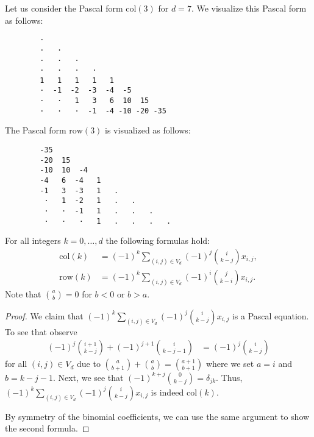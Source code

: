 \begin{example}
    Let us consider the Pascal form \( \mathrm{col}(3) \) for \( d = 7 \). We visualize this Pascal form as follows: 
    \begin{verbatim}
        · 
        ·   · 
        ·   ·   · 
        ·   ·   ·   · 
        1   1   1   1   1 
        ·  -1  -2  -3  -4  -5 
        ·   ·   1   3   6  10  15 
        ·   ·   ·  -1  -4 -10 -20 -35
    \end{verbatim}

    The Pascal form \( \mathrm{row}(3) \) is visualized as follows:
    \begin{verbatim}
        -35 
        -20  15 
        -10  10  -4 
        -4   6  -4   1 
        -1   3  -3   1   . 
         ·   1  -2   1   .   . 
         ·   ·  -1   1   .   .   . 
         ·   ·   ·   1   .   .   .   .
    \end{verbatim}
\end{example}

\begin{proposition}\label{prop:pascal-formulas}
    For all integers \( k = 0, \dots, d \) the following formulas hold:
    \begin{align*}
        \mathrm{col}(k)  &= (-1)^k \sum_{(i,j) \in V_d} (-1)^j \binom{i}{k-j} x_{i,j}, \\
        \mathrm{row}(k) &= (-1)^k \sum_{(i,j) \in V_d} (-1)^i \binom{j}{k-i} x_{i,j}.
    \end{align*} 
    Note that \( \binom{a}{b} = 0 \) for \( b < 0 \) or \( b > a \).
\end{proposition}

\begin{proof}
    We claim that \( (-1)^k \sum_{(i,j) \in V_d} (-1)^j \binom{i}{k-j} x_{i,j} \) is a Pascal equation. To see that observe 
    \begin{align*}
        (-1)^j \binom{i+1}{k-j} + (-1)^{j+1} \binom{i}{k-j-1} &= (-1)^j \binom{i}{k-j}
    \end{align*}
    for all \( (i,j) \in V_{d} \) due to \(  \binom{a}{b+1} + \binom{a}{b} = \binom{a+1}{b+1} \) where we set \( a = i \) and \( b = k-j-1 \). Next, we see that \( (-1)^{k+j} \binom{0}{k-j} = \delta_{jk} \). Thus, \( (-1)^k \sum_{(i,j) \in V_d} (-1)^j \binom{i}{k-j} x_{i,j} \) is indeed \( \mathrm{col}(k) \).

    By symmetry of the binomial coefficients, we can use the same argument to show the second formula.
\end{proof}

